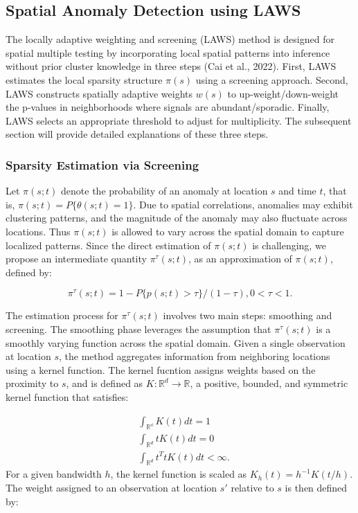 \documentclass[11pt]{article}
\begin{document}
\subsection{Spatial Anomaly Detection using LAWS}\label{sec:LAWS}
The locally adaptive weighting and screening (LAWS) method is designed for spatial multiple testing by incorporating local spatial patterns into inference without prior cluster knowledge in three steps (Cai et al., 2022). First, LAWS estimates the local sparsity structure $\pi(s)$ using a screening approach. Second, LAWS constructs spatially adaptive weights $w(s)$ to up-weight/down-weight the p-values in neighborhoods where signals are abundant/sporadic. Finally, LAWS selects an appropriate threshold to adjust for multiplicity. The subsequent section will provide detailed explanations of these three steps.

 

\subsubsection*{Sparsity Estimation via Screening}
Let $\pi(s;t)$ denote the probability of an anomaly at location $s$ and time $t$, that is, $\pi(s;t)=P\{\theta(s;t)=1\}$. Due to spatial correlations, anomalies may exhibit clustering patterns, and the magnitude of the anomaly may also fluctuate across locations. Thus $\pi(s;t)$ is allowed to vary across the spatial domain to capture localized patterns. Since the direct estimation of $\pi(s;t)$ is challenging, we propose an intermediate quantity $\pi^{\tau}(s;t)$, as an approximation of $\pi(s;t)$, defined by:

\begin{equation}
	\pi^{\tau}(s;t)=1-P\{p(s;t)>\tau\}/(1-\tau), 0<\tau<1.
\end{equation}

The estimation process for $\pi^{\tau}(s;t)$ involves two main steps: smoothing and screening. The smoothing phase leverages the assumption that $\pi^{\tau}(s;t)$ is a smoothly varying function across the spatial domain. Given a single observation at location $s$, the method aggregates information from neighboring locations using a kernel function. The kernel fucntion assigns weights based on the proximity to $s$, and is defined as $K:\mathbb{R}^d\rightarrow\mathbb{R}$, a positive, bounded, and symmetric kernel function that satisfies:

\begin{align}
	&\int_{\mathbb{R^d}}K(t)dt=1\\
	&\int_{\mathbb{R}^d}tK(t)dt=0\\
	&\int_{\mathbb{R}^d}t^{T}tK(t)dt<\infty.
\end{align}
For a given bandwidth $h$, the kernel function is scaled as $K_h(t)=h^{-1}K(t/h)$. The weight assigned to an observation at location $s'$ relative to $s$ is then defined by:
\end{document}
